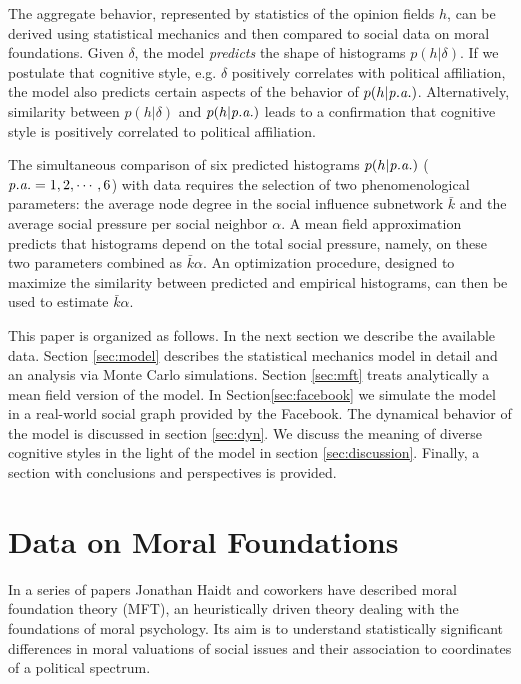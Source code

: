 \documentclass[twocolumn,showpacs]{revtex4-1}
\begin{document}
 
 
The aggregate behavior, represented by statistics of the opinion fields $h$, can be derived using statistical mechanics and then compared to 
social data on moral foundations. Given $\delta$, the model {\it predicts} the shape of histograms $p(h|\delta)$. If we postulate that cognitive style, e.g. 
$\delta$ positively correlates with political affiliation, 
the model also predicts certain aspects of the behavior of 
$ p(h|\mbox{\it p.a.})$. Alternatively, similarity between  $p(h|\delta)$ 
and $ p(h|\mbox{\it p.a.})$ leads to a confirmation that cognitive style is 
positively correlated to political affiliation.



The simultaneous comparison
of six predicted histograms $ p(h|\mbox{\it p.a.})$ ($\mbox{\it p.a.}=1,2,\cdots,6$) with data requires the selection of two phenomenological parameters: 
the average node degree in the social influence subnetwork $\bar{k}$ and the average social pressure per social neighbor $\alpha$. A mean field approximation predicts that histograms depend on the total social pressure, namely, on these two parameters combined as  $\bar{k} \alpha$.   An optimization procedure, designed to maximize the similarity between  predicted and empirical histograms, can then be used to estimate $\bar{k} \alpha$.


This paper is organized as follows. In the next section we describe the available data. Section \ref{sec:model}
 describes the statistical mechanics model in detail and an analysis  via Monte Carlo simulations. Section \ref{sec:mft} treats analytically a mean field version of the model. In Section\ref{sec:facebook} we simulate the model in a real-world social graph provided by the Facebook. The dynamical behavior of the model is discussed in section \ref{sec:dyn}. We discuss the meaning of diverse cognitive styles in the light of the model in section \ref{sec:discussion}.  Finally, a section with conclusions and perspectives is provided.




\section{\label{sec:empirical} Data on Moral Foundations}

In a series of papers \cite{Haidt1,Haidt04, Haidt4,Haidt2,Haidt07,Haidt3} Jonathan Haidt and coworkers 
have described moral foundation theory (MFT),
an heuristically driven theory dealing with the
foundations of moral psychology. Its aim is to understand
statistically significant differences in moral valuations 
of social issues and their
association to  coordinates of a political spectrum. 
\end{document}
